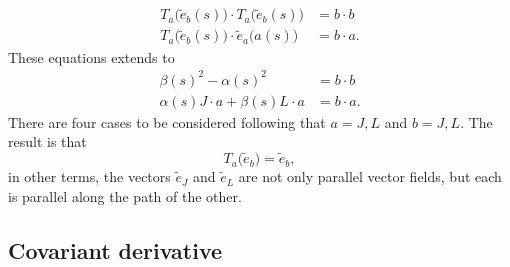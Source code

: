 \begin{subequations}
\begin{align}
  T_a\big( \tilde{e}_b(s) \big)\cdot T_a\big( \tilde{e}_b(s) \big)&=b\cdot b\\
 T_a\big( \tilde{e}_b(s) \big)\cdot \tilde{e}_a\big( a(s) \big)&=b\cdot a.
\end{align}
\end{subequations}
These equations extends to
\begin{subequations}
\begin{align}
  \beta(s)^2-\alpha(s)^2&=b\cdot b\\
\alpha(s)J\cdot a+\beta(s)L\cdot a&=b\cdot a.
\end{align}
\end{subequations}
There are four cases to be considered following that $a=J,L$ and $b=J,L$. The result is that
\begin{equation}
T_a\big(\tilde{e}_b \big)=\tilde{e}_b,
\end{equation}
in other terms, the vectors $\tilde{e}_J$ and $\tilde{e}_L$ are not only parallel vector fields, but each is parallel along the path of the other.

\subsection{Covariant derivative}

